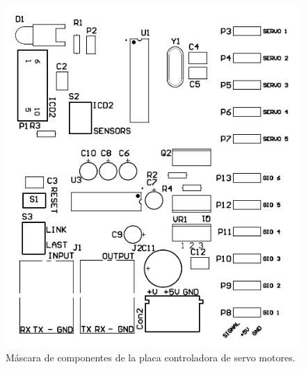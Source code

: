 \begin{figure}
	\centering
	\includegraphics[scale=.33]{figuras/servo_componentes.png}
	\caption{M\'ascara de componentes de la placa controladora de servo motores.}
	\label{hF_placa_servo_componentes}
\end{figure}


